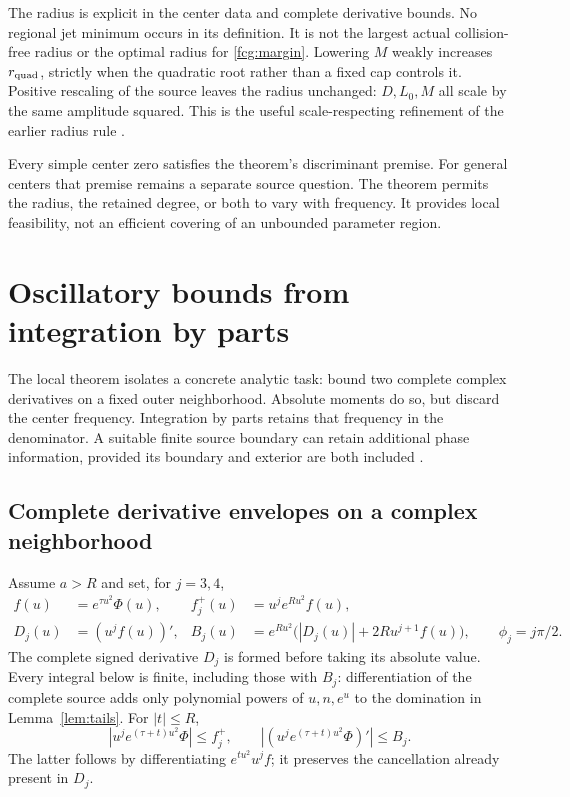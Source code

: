 \documentclass[11pt]{article}
\numberwithin{equation}{section}
\begin{document}
The radius is explicit in the center data and complete derivative
bounds. No regional jet minimum occurs in its definition. It is not
the largest actual collision-free radius or the optimal radius for
\eqref{fcg:margin}. Lowering $M$ weakly increases $r_{\rm quad}$,
strictly when the quadratic root rather than a fixed cap controls it.
Positive rescaling of the source leaves the radius unchanged: $D,L_0,M$
all scale by the same amplitude squared. This is the useful
scale-respecting refinement of the earlier radius rule
\cite{FCGSharpRadius}.

Every simple center zero satisfies the theorem's discriminant premise.
For general centers that premise remains a separate source question.
The theorem permits the radius, the retained degree, or both to vary
with frequency. It provides local feasibility, not an efficient
covering of an unbounded parameter region.

\section{Oscillatory bounds from integration by parts}
\label{fcg:ibp}

The local theorem isolates a concrete analytic task: bound two complete
complex derivatives on a fixed outer neighborhood. Absolute moments
do so, but discard the center frequency. Integration by parts retains
that frequency in the denominator. A suitable finite source boundary
can retain additional phase information, provided its boundary and
exterior are both included \cite{FCGAdaptive}.

\subsection{Complete derivative envelopes on a complex neighborhood}

Assume $a>R$ and set, for $j=3,4$,
\begin{align}
 f(u)&=e^{\tau u^2}\Phi(u),&
 f_j^+(u)&=u^j e^{Ru^2}f(u),\nonumber\\
 D_j(u)&=(u^jf(u))',&
 B_j(u)&=e^{Ru^2}\bigl(|D_j(u)|+2R u^{j+1}f(u)\bigr),
 \qquad \phi_j=j\pi/2.\label{fcg:ibpweights}
\end{align}
The complete signed derivative $D_j$ is formed before taking its
absolute value. Every integral below is finite, including those with
$B_j$: differentiation of the complete source adds only polynomial
powers of $u,n,e^u$ to the domination in Lemma~\ref{lem:tails}.
For $|t|\le R$,
\begin{equation}\label{fcg:ibpweightbounds}
 |u^j e^{(\tau+t)u^2}\Phi|\le f_j^+,\qquad
 |(u^j e^{(\tau+t)u^2}\Phi)'|\le B_j.
\end{equation}
The latter follows by differentiating $e^{tu^2}u^jf$; it preserves
the cancellation already present in $D_j$.
\end{document}
